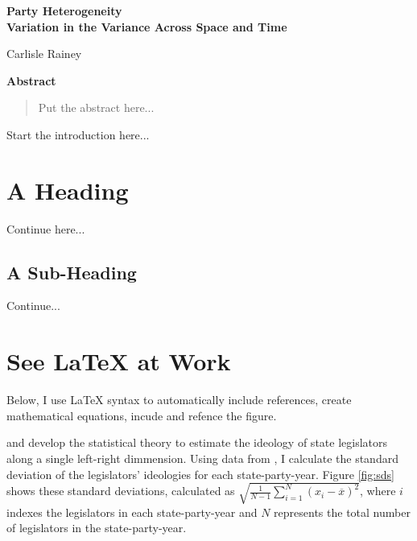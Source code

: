 \documentclass[12pt]{article}
\begin{document}
\begin{center}
{\LARGE \textbf{Party Heterogeneity}}\\\vspace{2mm}
{ \textbf{Variation in the Variance Across Space and Time}}

\vspace{5mm}

Carlisle Rainey
\end{center}

\vspace{5mm}

{\centerline{\textbf{Abstract}}}
\begin{quote}
\noindent Put the abstract here...
\end{quote}

\thispagestyle{empty}

\doublespace

Start the introduction here...

\section*{A Heading}

Continue here...

\subsection*{A Sub-Heading}

Continue...

\section*{See LaTeX at Work}

Below, I use LaTeX syntax to automatically include references, create mathematical equations, incude and refence the figure.

\cite{shor-mccarty-2011} and \cite{shor-berry-mccarty-2010} develop the statistical theory to estimate the ideology of state legislators along a single left-right dimmension. Using data from \cite{shor-2018-data}, I calculate the standard deviation of the legislators' ideologies for each state-party-year. Figure \ref{fig:sds} shows these standard deviations, calculated as $\sqrt{\frac{1}{N-1} \sum_{i=1}^N (x_i - \overline{x})^2}$, where $i$ indexes the legislators in each state-party-year and $N$ represents the total number of legislators in the state-party-year.
\end{document}
